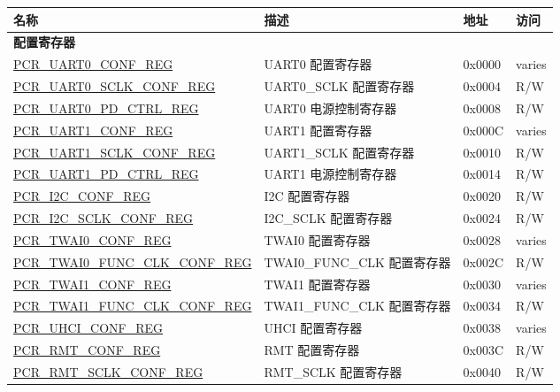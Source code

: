\begin{longtable}{ | p{7.2cm} | p{6cm} | p{1.3cm} | p{1cm} | }
\hline\rowcolor{lightgray}
\textbf{名称} & \textbf{描述} &  \textbf{地址} & \textbf{访问} \\ \hline
\endhead
\multicolumn{4}{|l|}{\textbf{配置寄存器}} \\ \hline
\hyperref[regdesc:PCRUART0CONFREG]{PCR\_UART0\_CONF\_REG} & UART0 配置寄存器 & 0x0000 & varies \\ \hline
\hyperref[regdesc:PCRUART0SCLKCONFREG]{PCR\_UART0\_SCLK\_CONF\_REG} & UART0\_SCLK 配置寄存器 & 0x0004 & R/W \\ \hline
\hyperref[regdesc:PCRUART0PDCTRLREG]{PCR\_UART0\_PD\_CTRL\_REG} & UART0 电源控制寄存器 & 0x0008 & R/W \\ \hline
\hyperref[regdesc:PCRUART1CONFREG]{PCR\_UART1\_CONF\_REG} & UART1 配置寄存器 & 0x000C & varies \\ \hline
\hyperref[regdesc:PCRUART1SCLKCONFREG]{PCR\_UART1\_SCLK\_CONF\_REG} & UART1\_SCLK 配置寄存器 & 0x0010 & R/W \\ \hline
\hyperref[regdesc:PCRUART1PDCTRLREG]{PCR\_UART1\_PD\_CTRL\_REG} & UART1 电源控制寄存器 & 0x0014 & R/W \\ \hline
\hyperref[regdesc:PCRI2CCONFREG]{PCR\_I2C\_CONF\_REG} & I2C 配置寄存器 & 0x0020 & R/W \\ \hline
\hyperref[regdesc:PCRI2CSCLKCONFREG]{PCR\_I2C\_SCLK\_CONF\_REG} & I2C\_SCLK 配置寄存器 & 0x0024 & R/W \\ \hline
\hyperref[regdesc:PCRTWAI0CONFREG]{PCR\_TWAI0\_CONF\_REG} & TWAI0 配置寄存器 & 0x0028 & varies \\ \hline
\hyperref[regdesc:PCRTWAI0FUNCCLKCONFREG]{PCR\_TWAI0\_FUNC\_CLK\_CONF\_REG} & TWAI0\_FUNC\_CLK 配置寄存器 & 0x002C & R/W \\ \hline
\hyperref[regdesc:PCRTWAI1CONFREG]{PCR\_TWAI1\_CONF\_REG} & TWAI1 配置寄存器 & 0x0030 & varies \\ \hline
\hyperref[regdesc:PCRTWAI1FUNCCLKCONFREG]{PCR\_TWAI1\_FUNC\_CLK\_CONF\_REG} & TWAI1\_FUNC\_CLK 配置寄存器 & 0x0034 & R/W \\ \hline
\hyperref[regdesc:PCRUHCICONFREG]{PCR\_UHCI\_CONF\_REG} & UHCI 配置寄存器 & 0x0038 & varies \\ \hline
\hyperref[regdesc:PCRRMTCONFREG]{PCR\_RMT\_CONF\_REG} & RMT 配置寄存器 & 0x003C & R/W \\ \hline
\hyperref[regdesc:PCRRMTSCLKCONFREG]{PCR\_RMT\_SCLK\_CONF\_REG} & RMT\_SCLK 配置寄存器 & 0x0040 & R/W \\ \hline

\end{longtable}
